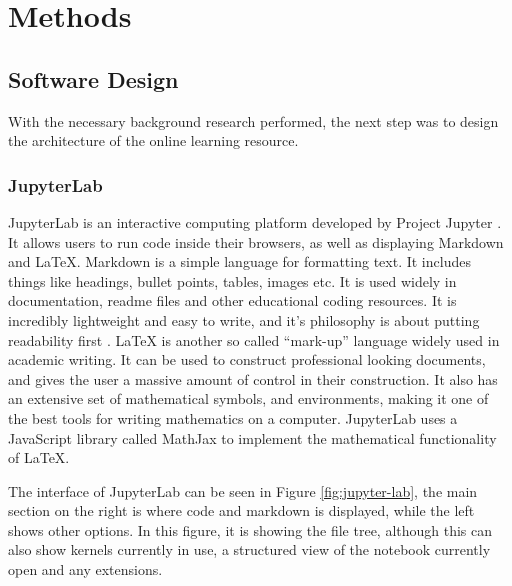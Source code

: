 \chapter{Methods}
\label{chapter2}


\section{Software Design} \label{section:software-design}

With the necessary background research performed, the next step was to design the architecture of the online learning resource.

\subsection{JupyterLab} \label{subsection:jupyter-lab}

JupyterLab is an interactive computing platform developed by Project Jupyter \cite{Kluyver2016jupyter}. It allows users to run code inside their browsers, as well as displaying Markdown and LaTeX. Markdown is a simple language for formatting text. It includes things like headings, bullet points, tables, images etc. It is used widely in documentation, readme files and other educational coding resources. It is incredibly lightweight and easy to write, and it's philosophy is about putting readability first \cite{markdown}. LaTeX is another so called ``mark-up'' language widely used in academic writing. It can be used to construct professional looking documents, and gives the user a massive amount of control in their construction. It also has an extensive set of mathematical symbols, and environments, making it one of the best tools for writing mathematics on a computer. JupyterLab uses a JavaScript library called MathJax \cite{mathjax} to implement the mathematical functionality of LaTeX.

The interface of JupyterLab can be seen in Figure \ref{fig:jupyter-lab}, the main section on the right is where code and markdown is displayed, while the left shows other options. In this figure, it is showing the file tree, although this can also show kernels currently in use, a structured view of the notebook currently open and any extensions.

